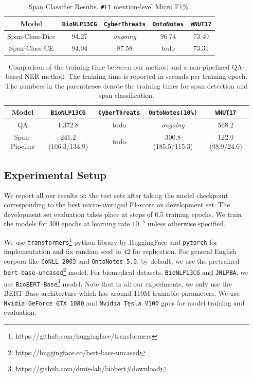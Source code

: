 \begin{table}[h!]
\centering
\begin{small}
\begin{tabular}{ccccc}\toprule
 \textbf{Model} & \texttt{BioNLP13CG} & \texttt{CyberThreats} & \texttt{OntoNotes} & \texttt{WNUT17} \\ \toprule 
Span-Class-Dice & 94.27 & \textit{ongoing} &  96.74 & 73.40  \\
Span-Class-CE     & 94.04 & 87.58 & todo & 73.31  \\
\bottomrule
\end{tabular}
\caption{Span Classifier Results. \texttt{\#F1} mention-level Micro F1\%.}
\label{tab:class_ablation}
\end{small}
\end{table}

\begin{table}[h!]
\centering
\begin{small}
\begin{tabular}{ccccc}\toprule
 \textbf{Model} & \texttt{BioNLP13CG} & \texttt{CyberThreats} & \texttt{OntoNotes(10\%)} & \texttt{WNUT17} \\ \toprule 
QA                & 1,372.8 & todo & \textit{ongoing}  & 568.2\\
Span-Pipeline     & 241.2 (106.3/134.9) & todo & 300.8 (185.5/115.3)  & 122.9 (98.9/24.0)\\
\bottomrule
\end{tabular}
\caption{Comparison of the training time between our method and a non-pipelined QA-based NER method. 
    The training time is reported in seconds per training epoch. The numbers in the parentheses denote the training times for span detection and span classification. }
\label{tab:train_time_ablation}
\end{small}
\end{table}

\subsection{Experimental Setup}
We report all our results on the test sets after taking the model checkpoint corresponding to the best micro-averaged F1-score on development set. The development set evaluation takes place at steps of 0.5 training epochs. We train the models for $300$ epochs at learning rate $10^{-5}$ unless otherwise specified.

We use \texttt{transformers}\footnote{https://github.com/huggingface/transformers} python library by HuggingFace and \texttt{pytorch} for implementation and fix random seed to $42$ for replication. For general English corpora like \texttt{CoNLL 2003} and \texttt{OntoNotes 5.0}, by default, we use the pretrained \texttt{bert-base-uncased}\footnote{https://huggingface.co/bert-base-uncased} model. For biomedical datasets, \texttt{BioNLP13CG} and \texttt{JNLPBA}, we use \texttt{BioBERT-Base}\footnote{https://github.com/dmis-lab/biobert\#download} model. Note that in all our experiments, we only use the BERT-Base architecture which has around 110M trainable parameters. We use \texttt{Nvidia GeForce GTX 1080} and \texttt{Nvidia Tesla V100} gpus for model training and evaluation.

